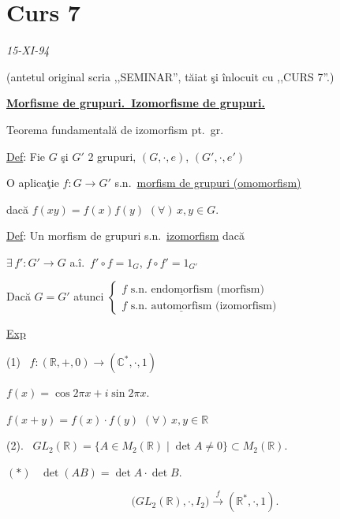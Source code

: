 \newpage
\section{Curs 7}



\begin{center}
\end{center}
\begin{flushright}
\textit{15-XI-94}
\end{flushright}
\noindent \footnotesize (antetul original scria ,,SEMINAR'', tăiat şi înlocuit cu ,,CURS 7''.)\normalsize

\bigskip
\noindent\underline{\textbf{Morfisme de grupuri.\ Izomorfisme de grupuri.}}

\noindent Teorema fundamentală de izomorfism pt.\ gr.

\bigskip
\noindent\underline{Def}: Fie $G$ şi $G'$ 2 grupuri, $(G,\cdot,e)$, $(G',\cdot,e')$

\noindent O aplicaţie $f:G\to G'$ s.n.\ \underline{morfism de grupuri (omomorfism)}

\noindent dacă $f(xy)=f(x)f(y)$ $(\forall)\,x,y\in G$.

\bigskip
\noindent\underline{Def}: Un morfism de grupuri s.n.\ \underline{izomorfism} dacă

\noindent $\exists\,f':G'\to G$ a.î.\ $f'\circ f=1_G$, $f\circ f'=1_{G'}$

\bigskip
\noindent Dacă $G=G'$ atunci $\begin{cases} f \text{ s.n.\ } \underline{\text{endomorfism}} \text{ (morfism)} \\ f \text{ s.n.\ } \underline{\text{automorfism}} \text{ (izomorfism)}\end{cases}$

\bigskip
\noindent\underline{Exp}

\noindent (1) \ $f:(\mathbb{R},+,0) \to (\mathbb{C}^*,\cdot,1)$

\noindent $f(x) = \cos 2\pi x + i\sin 2\pi x$.

\noindent $f(x+y) = f(x)\cdot f(y)$ $(\forall)\,x,y\in\mathbb{R}$

\bigskip
\noindent (2). \ $GL_2(\mathbb{R}) = \{A\in M_2(\mathbb{R}) \mid \det A\neq 0\} \subset M_2(\mathbb{R})$.

\noindent $(*)$ \ $\det(AB) = \det A\cdot \det B$.

\[
\big(GL_2(\mathbb{R}),\cdot,I_2\big) \xrightarrow{\ f\ } (\mathbb{R}^*,\cdot,1).
\]

